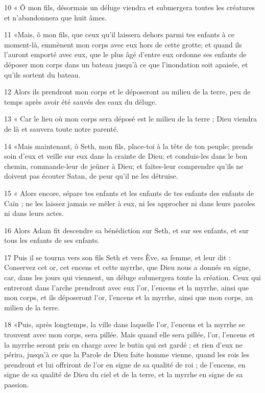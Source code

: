 \par 10 « Ô mon fils, désormais un déluge viendra et submergera toutes les créatures et n'abandonnera que huit âmes.

\par 11 «Mais, ô mon fils, que ceux qu'il laissera dehors parmi tes enfants à ce moment-là, emmènent mon corps avec eux hors de cette grotte; et quand ils l'auront emporté avec eux, que le plus âgé d'entre eux ordonne ses enfants de déposer mon corps dans un bateau jusqu'à ce que l'inondation soit apaisée, et qu'ils sortent du bateau.

\par 12 Alors ils prendront mon corps et le déposeront au milieu de la terre, peu de temps après avoir été sauvés des eaux du déluge.

\par 13 « Car le lieu où mon corps sera déposé est le milieu de la terre ; Dieu viendra de là et sauvera toute notre parenté.

\par 14 «Mais maintenant, ô Seth, mon fils, place-toi à la tête de ton peuple; prends soin d'eux et veille sur eux dans la crainte de Dieu; et conduis-les dans le bon chemin, commande-leur de jeûner à Dieu; et faites-leur comprendre qu’ils ne doivent pas écouter Satan, de peur qu’il ne les détruise.

\par 15 « Alors encore, sépare tes enfants et les enfants de tes enfants des enfants de Caïn ; ne les laissez jamais se mêler à eux, ni les approcher ni dans leurs paroles ni dans leurs actes.

\par 16 Alors Adam fit descendre sa bénédiction sur Seth, et sur ses enfants, et sur tous les enfants de ses enfants.

\par 17 Puis il se tourna vers son fils Seth et vers Ève, sa femme, et leur dit : Conservez cet or, cet encens et cette myrrhe, que Dieu nous a donnés en signe, car, dans les jours qui viennent, un déluge submergera toute la création. Ceux qui entreront dans l'arche prendront avec eux l'or, l'encens et la myrrhe, ainsi que mon corps, et ils déposeront l'or, l'encens et la myrrhe, ainsi que mon corps, au milieu de la terre.

\par 18 «Puis, après longtemps, la ville dans laquelle l'or, l'encens et la myrrhe se trouvent avec mon corps, sera pillée. Mais quand elle sera pillée, l'or, l'encens et la myrrhe seront pris en charge avec le butin qui est gardé ; et rien d’eux ne périra, jusqu’à ce que la Parole de Dieu faite homme vienne, quand les rois les prendront et lui offriront de l’or en signe de sa qualité de roi ; de l’encens, en signe de sa qualité de Dieu du ciel et de la terre, et la myrrhe en signe de sa passion.

